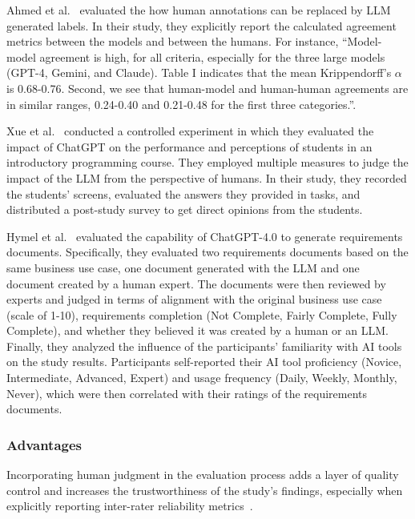 Ahmed et al.~\cite{DBLP:journals/corr/abs-2408-05534} evaluated the how human annotations can be replaced by LLM generated labels.
In their study, they explicitly report the calculated agreement metrics between the models and between the humans.
For instance, ``Model-model agreement is high, for all criteria, especially for the three large models (GPT-4, Gemini, and Claude). Table I indicates that the mean Krippendorff’s $\alpha$ is 0.68-0.76. 
Second, we see that human-model and human-human agreements are in similar ranges, 0.24-0.40 and 0.21-0.48
for the first three categories.''.

Xue et al.~\cite{DBLP:conf/icse/XueCBTH24} conducted a controlled experiment in which they evaluated the impact of ChatGPT on the performance and perceptions of students in an introductory programming course.
They employed multiple measures to judge the impact of the LLM from the perspective of humans.
In their study, they recorded the students' screens, evaluated the answers they provided in tasks, and distributed a post-study survey to get direct opinions from the students.

Hymel et al.~\cite{hymel2025analysisllmsvshuman} evaluated the capability of ChatGPT-4.0 to generate requirements documents. 
Specifically, they evaluated two requirements documents based on the same business use case, one document generated with the LLM and one document created by a human expert.
The documents were then reviewed by experts and judged in terms of alignment with the original business use case (scale of 1-10), requirements completion (Not Complete, Fairly Complete, Fully Complete), and whether they believed it was created by a human or an LLM.
Finally, they analyzed the influence of the participants' familiarity with AI tools on the study results.
Participants self-reported their AI tool proficiency (Novice, Intermediate, Advanced, Expert) and usage frequency (Daily, Weekly, Monthly, Never), which were then correlated with their ratings of the requirements documents.


\subsubsection{Advantages}

Incorporating human judgment in the evaluation process adds a layer of quality control and increases the trustworthiness of the study's findings, especially when explicitly reporting inter-rater reliability metrics~\cite{khraisha2024canlargelanguagemodelshumans}.

